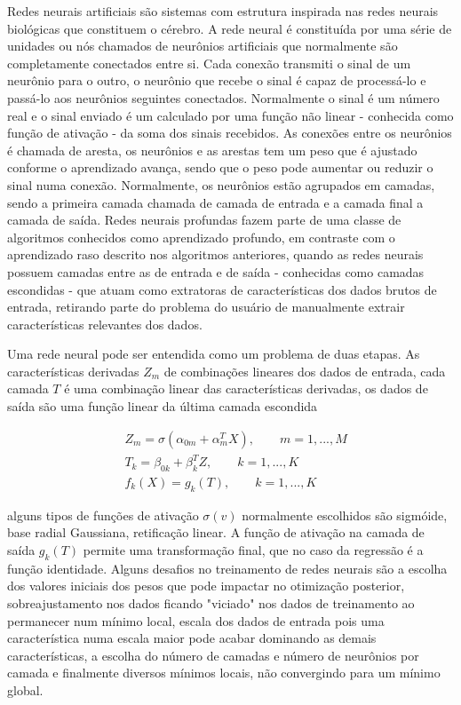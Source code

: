 \documentclass[twocolumn]{rbef}
\newcommand{\1}{\mathbbm{1}}
\begin{document}
Redes neurais artificiais são sistemas com estrutura inspirada nas redes neurais biológicas que constituem o cérebro. A rede neural é constituída por uma série de unidades ou nós chamados de neurônios artificiais que normalmente são completamente conectados entre si. Cada conexão transmiti o sinal de um neurônio para o outro, o neurônio que recebe o sinal é capaz de processá-lo e passá-lo aos neurônios seguintes conectados. Normalmente o sinal é um número real e o sinal enviado é um calculado por uma função não linear - conhecida como função de ativação - da soma dos sinais recebidos. As conexões entre os neurônios é chamada de aresta, os neurônios e as arestas tem um peso que é ajustado conforme o aprendizado avança, sendo que o peso pode aumentar ou reduzir o sinal numa conexão. Normalmente, os neurônios estão agrupados em camadas, sendo a primeira camada chamada de camada de entrada e a camada final a camada de saída\cite{James}. Redes neurais profundas fazem parte de uma classe de algoritmos conhecidos como aprendizado profundo, em contraste com o aprendizado raso descrito nos algoritmos anteriores, quando as redes neurais possuem camadas entre as de entrada e de saída - conhecidas como camadas escondidas - que atuam como extratoras de características dos dados brutos de entrada, retirando parte do problema do usuário de manualmente extrair características relevantes dos dados.

Uma rede neural pode ser entendida como um problema de duas etapas. As características derivadas $Z_{m}$ de combinações lineares dos dados de entrada, cada camada $T$ é uma combinação linear das características derivadas, os dados de saída são uma função linear da última camada escondida\cite{Hastie}

\begin{equation}
    \begin{split}
        & Z_{m} = \sigma (\alpha_{0m} + \alpha_{m}^{T} X  ), \qquad m=1,...,M \\
        & T_{k} = \beta_{0k} + \beta_{k}^{T}Z, \qquad k=1,...,K \\
        & f_{k}(X) = g_{k}(T), \qquad k=1,...,K
    \end{split}
\end{equation}

alguns tipos de funções de ativação $\sigma(v)$ normalmente escolhidos são sigmóide, base radial Gaussiana, retificação linear. A função de ativação na camada de saída $g_{k}(T)$ permite uma transformação final, que no caso da regressão é a função identidade. Alguns desafios no treinamento de redes neurais são a escolha dos valores iniciais dos pesos que pode impactar no otimização posterior, sobreajustamento nos dados ficando "viciado" nos dados de treinamento ao permanecer num mínimo local, escala dos dados de entrada pois uma característica numa escala maior pode acabar dominando as demais características, a escolha do número de camadas e número de neurônios por camada e finalmente diversos mínimos locais, não convergindo para um mínimo global\cite{Hastie}.
\end{document}
